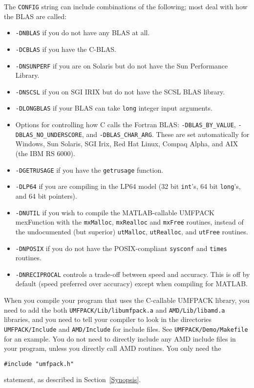 \documentclass[11pt]{article}
\begin{document}
The {\tt CONFIG} string can include combinations of the following;
most deal with how the BLAS are called:
\begin{itemize}
\item {\tt -DNBLAS} if you do not have any BLAS at all.
\item {\tt -DCBLAS} if you have the C-BLAS.
\item {\tt -DNSUNPERF} if you are on Solaris but do not have the Sun
    Performance Library.
\item {\tt -DNSCSL} if you on SGI IRIX but do not have the SCSL BLAS library.
\item {\tt -DLONGBLAS} if your BLAS can take {\tt long} integer input
    arguments.
\item Options for controlling how C calls the Fortran BLAS:
    {\tt -DBLAS\_BY\_VALUE}, {\tt -DBLAS\_NO\_UNDERSCORE},
    and {\tt -DBLAS\_CHAR\_ARG}.  These are set automatically for Windows,
    Sun Solaris, SGI Irix, Red Hat Linux, Compaq Alpha, and
    AIX (the IBM RS 6000).
\item {\tt -DGETRUSAGE} if you have the {\tt getrusage} function.
\item {\tt -DLP64} if you are compiling in the LP64 model (32 bit {\tt int}'s,
    64 bit {\tt long}'s, and 64 bit pointers).
\item {\tt -DNUTIL} if you wish to compile the MATLAB-callable
    UMFPACK mexFunction with the {\tt mxMalloc}, {\tt mxRealloc}
    and {\tt mxFree} routines, instead of the undocumented (but
    superior) {\tt utMalloc}, {\tt utRealloc}, and {\tt utFree}
    routines.
\item {\tt -DNPOSIX} if you do not have the POSIX-compliant
    {\tt sysconf} and {\tt times} routines.
\item {\tt -DNRECIPROCAL} controls a trade-off between speed and accuracy.
    This is off by default (speed preferred over accuracy) except when
    compiling for MATLAB.
\end{itemize}

When you compile your program that uses the C-callable UMFPACK library,
you need to add the both {\tt UMFPACK/Lib/libumfpack.a} and
{\tt AMD/Lib/libamd.a}
libraries, and you need to tell your compiler to look in the
directories {\tt UMFPACK/Include} and {\tt AMD/Include} for include
files.  See {\tt UMFPACK/Demo/Makefile} for an example.
You do not need to directly include any AMD include files in your
program, unless you directly call AMD routines.  You only need the
\begin{verbatim}
#include "umfpack.h"
\end{verbatim}
statement, as described in Section~\ref{Synopsis}.
\end{document}
